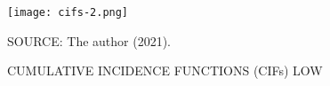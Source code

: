 \begin{figure}[H]
 \setlength{\abovecaptionskip}{.0001pt}
 \caption{CUMULATIVE INCIDENCE FUNCTIONS (CIFs) LOW}
 \vspace{0.2cm}\centering
 \texttt{[image: cifs-2.png]}\\
 \begin{footnotesize}
  SOURCE: The author (2021).
 \end{footnotesize}
 \label{fig:cifslow}
\end{figure}




